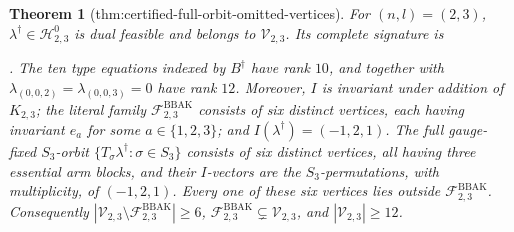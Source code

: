 \documentclass{article}
\newtheorem{theorem}{Theorem}
\begin{document}
\begin{theorem}[thm:certified-full-orbit-omitted-vertices]\label{thm:certified-full-orbit-omitted-vertices}
For \((n,l)=(2,3)\), \(\lambda^\dagger\in\mathcal H^0_{2,3}\) is dual feasible and belongs to \(\mathcal V_{2,3}\). Its complete signature is \par\noindent {}\par\noindent. The ten type equations indexed by \(B^\dagger\) have rank \(10\), and together with \(\lambda_{(0,0,2)}=\lambda_{(0,0,3)}=0\) have rank \(12\). Moreover, \(I\) is invariant under addition of \(K_{2,3}\); the literal family \(\mathcal F^{\mathrm{BBAK}}_{2,3}\) consists of six distinct vertices, each having invariant \(e_a\) for some \(a\in\{1,2,3\}\); and \(I(\lambda^\dagger)=(-1,2,1)\). The full gauge-fixed \(S_3\)-orbit \(\{T_\sigma\lambda^\dagger:\sigma\in S_3\}\) consists of six distinct vertices, all having three essential arm blocks, and their \(I\)-vectors are the \(S_3\)-permutations, with multiplicity, of \((-1,2,1)\). Every one of these six vertices lies outside \(\mathcal F^{\mathrm{BBAK}}_{2,3}\). Consequently \(|\mathcal V_{2,3}\setminus\mathcal F^{\mathrm{BBAK}}_{2,3}|\ge6\), \(\mathcal F^{\mathrm{BBAK}}_{2,3}\subsetneq\mathcal V_{2,3}\), and \(|\mathcal V_{2,3}|\ge12\).
\end{theorem}
\end{document}
